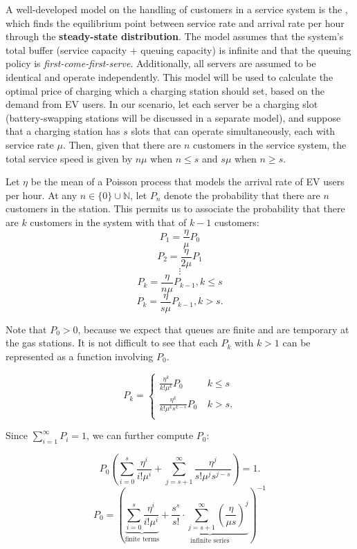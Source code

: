\documentclass[10pt]{article}
\begin{document}
A well-developed model on the handling of customers in a service system is the , which finds the equilibrium point between service rate and arrival rate per hour through the \textbf{steady-state distribution}. The model assumes that the system's total buffer (service capacity + queuing capacity) is infinite and that the queuing policy is \emph{first-come-first-serve}. Additionally, all servers are assumed to be identical and operate independently. This model will be used to calculate the optimal price of charging which a charging station should set, based on the demand from EV users. In our scenario, let each server be a charging slot (battery-swapping stations will be discussed in a separate model), and suppose that a charging station has $s$ slots that can operate simultaneously, each with service rate $\mu$. Then, given that there are $n$ customers in the service system, the total service speed is given by $n\mu$ when $n\le s$ and $s\mu$ when $n \ge s$.

Let $\eta$ be the mean of a Poisson process that models the arrival rate of EV users per hour. At any $n \in \{0\} \cup \mathbb{N}$, let $P_n$ denote the probability that there are $n$ customers in the station. This permits us to associate the probability that there are $k$ customers in the system with that of $k-1$ customers:
$$P_1 = \frac{\eta}{\mu}P_0$$
$$P_2 = \frac{\eta}{2\mu}P_1$$
$$\vdots$$
$$P_k = \frac{\eta}{n\mu}P_{k-1}, k \le s$$
$$P_k = \frac{\eta}{s\mu}P_{k-1}, k > s.$$

Note that $P_0 > 0$, because we expect that queues are finite and are temporary at the gas stations. It is not difficult to see that each $P_k$ with $k > 1$ can be represented as a function involving $P_0.$

\begin{equation}
    P_k = \begin{cases}
    \displaystyle\frac{\eta^k}{k!\mu^k}P_0 \  & k \le s \\[9pt]
    \displaystyle\frac{\eta^k}{k! \mu^k s^{k-s}}P_0\ & k > s.\\
    \end{cases}
\end{equation}

Since $\sum_{i=1}^\infty P_i = 1$, we can further compute $P_0$:

\begin{equation}
    P_0\left(\sum_{i=0}^s \frac{\eta^i}{i!\mu^i} + \sum_{j=s+1}^{\infty} \frac{\eta^j}{s! \mu^j s^{j-s}} \right) = 1.
\end{equation}
\begin{equation}
    P_0 = \left(\underbrace{\sum_{i=0}^s \frac{\eta^i}{i!\mu^i}}_{\text{finite terms}} + \underbrace{\frac{s^s}{s!}\cdot \sum_{j=s+1}^{\infty} \left(\frac{\eta}{\mu s}
    \right)^j}_{\text{infinite series}} \right)^{-1}
\end{equation}
\end{document}
